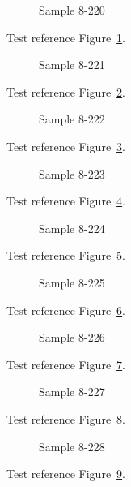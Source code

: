 \begin{figure}[tbhp]
\caption{Sample 8-220}
\label{fig:sample-8-220}
\end{figure}

Test reference Figure~\ref{fig:sample-8-220}.

\begin{figure}[tbhp]
\caption{Sample 8-221}
\label{fig:sample-8-221}
\end{figure}

Test reference Figure~\ref{fig:sample-8-221}.

\begin{figure}[tbhp]
\caption{Sample 8-222}
\label{fig:sample-8-222}
\end{figure}

Test reference Figure~\ref{fig:sample-8-222}.

\begin{figure}[tbhp]
\caption{Sample 8-223}
\label{fig:sample-8-223}
\end{figure}

Test reference Figure~\ref{fig:sample-8-223}.

\begin{figure}[tbhp]
\caption{Sample 8-224}
\label{fig:sample-8-224}
\end{figure}

Test reference Figure~\ref{fig:sample-8-224}.

\begin{figure}[tbhp]
\caption{Sample 8-225}
\label{fig:sample-8-225}
\end{figure}

Test reference Figure~\ref{fig:sample-8-225}.

\begin{figure}[tbhp]
\caption{Sample 8-226}
\label{fig:sample-8-226}
\end{figure}

Test reference Figure~\ref{fig:sample-8-226}.

\begin{figure}[tbhp]
\caption{Sample 8-227}
\label{fig:sample-8-227}
\end{figure}

Test reference Figure~\ref{fig:sample-8-227}.

\begin{figure}[tbhp]
\caption{Sample 8-228}
\label{fig:sample-8-228}
\end{figure}

Test reference Figure~\ref{fig:sample-8-228}.

